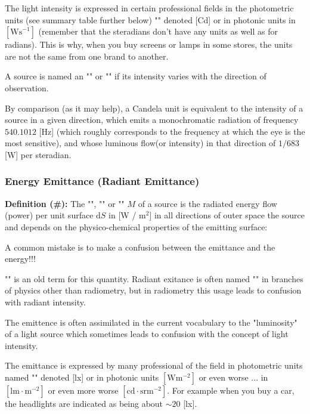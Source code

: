 	The light intensity is expressed in certain professional fields in the photometric units (see summary table further below) "" denoted [Cd] or in photonic units in $[\text{Ws}^{-1}]$ (remember that the steradians don't have any units as well as for radians). This is why, when you buy screens or lamps in some stores, the units are not the same from one brand to another.
	\begin{tcolorbox}[title=Remark,colframe=black,arc=10pt]
	A source is named an "" or "" if its intensity varies with the direction of observation.
	\end{tcolorbox}	
	By comparison (as it may help), a Candela unit is equivalent to the intensity of a source in a given direction, which emits a monochromatic radiation of frequency $540.1012$ [Hz] (which roughly corresponds to the frequency at which the eye is the most sensitive), and whose luminous flow(or intensity) in that direction of $1/683$ [W] per steradian.
	
	\subsubsection{Energy Emittance (Radiant Emittance)}
	\textbf{Definition (\#\mydef):} The "", "" or "" $M$ of a source is the radiated energy flow (power) per unit surface $\mathrm{d}S$ in [W / m${}^2$] in all directions of outer space the source and depends on the physico-chemical properties of the emitting surface:
	
	A common mistake is to make a confusion between the emittance and the energy!!!
	\begin{tcolorbox}[title=Remark,colframe=black,arc=10pt]
	"" is an old term for this quantity. Radiant exitance is often named "" in branches of physics other than radiometry, but in radiometry this usage leads to confusion with radiant intensity.
	\end{tcolorbox}	
	The emittence is often assimilated in the current vocabulary to the "luminosity" of a light source which sometimes leads to confusion with the concept of light intensity.
	
	The emittance is expressed by many professional of the field in photometric units named "" denoted [lx] or in photonic units $[\text{W}\text{m}^{-2}]$ or even worse ... in $[\text{lm}\cdot \text{m}^{-2}]$ or even more worse $[\text{cd}\cdot \text{sr} \text{m}^{-2}]$. For example when you buy a car, the headlights are indicated as being about $\sim 20$ [lx].
	
